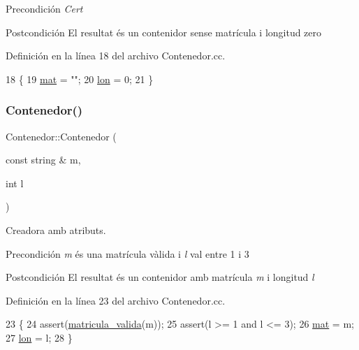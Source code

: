 \begin{DoxyPrecond}{Precondición}
{\itshape Cert} 
\end{DoxyPrecond}
\begin{DoxyPostcond}{Postcondición}
El resultat és un contenidor sense matrícula i longitud zero 
\end{DoxyPostcond}


Definición en la línea 18 del archivo Contenedor.\+cc.


\begin{DoxyCode}
18                        \{
19   \hyperlink{class_contenedor_a219718cff2c0f94314defbf8d747bfa9}{mat} = \textcolor{stringliteral}{""};
20   \hyperlink{class_contenedor_a364e04e5a1c7787463981f192f48e4ce}{lon} = 0;
21 \}
\end{DoxyCode}
\mbox{\label{class_contenedor_a84c6c247b6e5939fdd160160b1d1f449}} 
\subsubsection{\texorpdfstring{Contenedor()}{Contenedor()}\hspace{0.1cm}{\footnotesize\ttfamily [2/3]}}
{\footnotesize\ttfamily Contenedor\+::\+Contenedor (\begin{DoxyParamCaption}\item[{const string \&}]{m,  }\item[{int}]{l }\end{DoxyParamCaption})}



Creadora amb atributs. 

\begin{DoxyPrecond}{Precondición}
{\itshape m} és una matrícula vàlida i {\itshape l} val entre 1 i 3 
\end{DoxyPrecond}
\begin{DoxyPostcond}{Postcondición}
El resultat és un contenidor amb matrícula {\itshape m} i longitud {\itshape l} 
\end{DoxyPostcond}


Definición en la línea 23 del archivo Contenedor.\+cc.


\begin{DoxyCode}
23                                              \{
24   assert(\hyperlink{class_contenedor_a5d718d3fba965652412913e5613dabe8}{matricula\_valida}(m));
25   assert(l >= 1 and l <= 3);
26   \hyperlink{class_contenedor_a219718cff2c0f94314defbf8d747bfa9}{mat} = m;
27   \hyperlink{class_contenedor_a364e04e5a1c7787463981f192f48e4ce}{lon} = l;
28 \}
\end{DoxyCode}
\mbox{\label{class_contenedor_ada07edb2a23eec1f84b87b4b3de2c909}} 
